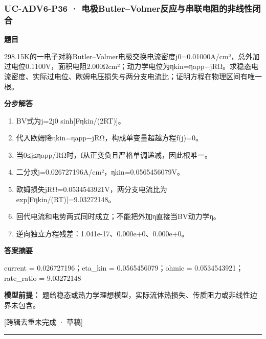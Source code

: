 \documentclass[UTF8,11pt,a4paper]{ctexart}
\begin{document}
\subsubsection*{UC-ADV6-P36 · 电极Butler–Volmer反应与串联电阻的非线性闭合}
\noindent\textbf{题目}\par
298.15K的一电子对称Butler–Volmer电极交换电流密度j0=0.01000A/cm²，总外加过电位0.1100V，面积电阻2.000Ωcm²；动力学电位为ηkin=ηapp−jRΩ。求稳态电流密度、实际过电位、欧姆电压损失与两分支电流比；证明方程在物理区间有唯一根。\par
\medskip\noindent\textbf{分步解答}
\begin{enumerate}
\item BV式为j=2j0 sinh[Fηkin/(2RT)]。
\item 代入欧姆降ηkin=ηapp−jRΩ，构成单变量超越方程f(j)=0。
\item 当0≤j≤ηapp/RΩ时，f从正变负且严格单调递减，因此根唯一。
\item 二分求j=0.026727196A/cm²，ηkin=0.0565456079V。
\item 欧姆损失jRΩ=0.0534543921V，两分支电流比为exp[Fηkin/(RT)]=9.03272148。
\item 回代电流和电势两式同时成立；不能把外加η直接当BV动力学η。
\item 逆向独立方程残差：1.041e-17、0.000e+0、0.000e+0。
\end{enumerate}
\noindent\textbf{答案摘要}\par
current = 0.026727196；eta\_kin = 0.0565456079；ohmic = 0.0534543921；rate\_ratio = 9.03272148\par
\noindent\textbf{模型前提：}
题给稳态或热力学理想模型，实际流体热损失、传质阻力或非线性边界未包含。\par
\noindent\textcolor{red!65!black}{[跨辑去重未完成 · 草稿]} \par
\medskip\hrule\medskip
{}
\end{document}

